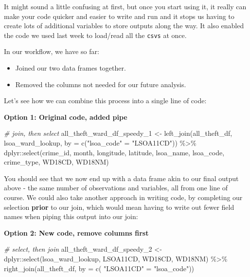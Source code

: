 \documentclass[
]{book}
\newenvironment{Shaded}{\begin{snugshade}}{\end{snugshade}}
\newcommand{\AttributeTok}[1]{\textcolor[rgb]{0.77,0.63,0.00}{#1}}
\newcommand{\CommentTok}[1]{\textcolor[rgb]{0.56,0.35,0.01}{\textit{#1}}}
\newcommand{\FunctionTok}[1]{\textcolor[rgb]{0.00,0.00,0.00}{#1}}
\newcommand{\NormalTok}[1]{#1}
\newcommand{\OtherTok}[1]{\textcolor[rgb]{0.56,0.35,0.01}{#1}}
\newcommand{\SpecialCharTok}[1]{\textcolor[rgb]{0.00,0.00,0.00}{#1}}
\newcommand{\StringTok}[1]{\textcolor[rgb]{0.31,0.60,0.02}{#1}}
\providecommand{\tightlist}{%
  \setlength{\itemsep}{0pt}\setlength{\parskip}{0pt}}
\begin{document}
It might sound a little confusing at first, but once you start using it, it really can make your code quicker and easier to write and run and it stops us having to create lots of additional variables to store outputs along the way. It also enabled the code we used last week to load/read all the \texttt{csvs} at once.

In our workflow, we have so far:

\begin{itemize}
\tightlist
\item
  Joined our two data frames together.
\item
  Removed the columns not needed for our future analysis.
\end{itemize}

Let's see how we can combine this process into a single line of code:

\textbf{Option 1: Original code, added pipe}

\begin{Shaded}
\begin{Highlighting}[]
\CommentTok{\# join, then select}
\NormalTok{all\_theft\_ward\_df\_speedy\_1 }\OtherTok{\textless{}{-}} \FunctionTok{left\_join}\NormalTok{(all\_theft\_df, lsoa\_ward\_lookup, }\AttributeTok{by =} \FunctionTok{c}\NormalTok{(}\StringTok{"lsoa\_code"} \OtherTok{=} \StringTok{"LSOA11CD"}\NormalTok{)) }\SpecialCharTok{\%\textgreater{}\%}\NormalTok{ dplyr}\SpecialCharTok{::}\FunctionTok{select}\NormalTok{(crime\_id, month, longitude, latitude, lsoa\_name, lsoa\_code, crime\_type, WD18CD, WD18NM)}
\end{Highlighting}
\end{Shaded}

You should see that we now end up with a data frame akin to our final output above - the same number of observations and variables, all from one line of course. We could also take another approach in writing code, by completing our selection \textbf{prior} to our join, which would mean having to write out fewer field names when piping this output into our join:

\textbf{Option 2: New code, remove columns first}

\begin{Shaded}
\begin{Highlighting}[]
\CommentTok{\# select, then join}
\NormalTok{all\_theft\_ward\_df\_speedy\_2 }\OtherTok{\textless{}{-}}\NormalTok{ dplyr}\SpecialCharTok{::}\FunctionTok{select}\NormalTok{(lsoa\_ward\_lookup, LSOA11CD, WD18CD, WD18NM) }\SpecialCharTok{\%\textgreater{}\%} \FunctionTok{right\_join}\NormalTok{(all\_theft\_df, }\AttributeTok{by =} \FunctionTok{c}\NormalTok{( }\StringTok{"LSOA11CD"} \OtherTok{=} \StringTok{"lsoa\_code"}\NormalTok{))}
\end{Highlighting}
\end{Shaded}
\end{document}
